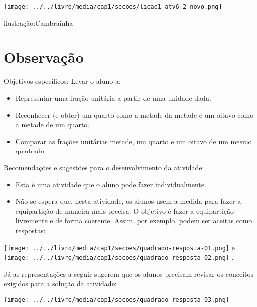 \documentclass{book}
\begin{document}
  $\ $     
  
    \texttt{[image: ../../livro/media/cap1/secoes/licao1\_atv6\_2\_novo.png]}  
  
  ilustração:Cambrainha  



\section{Observação}  
  
  Objetivos específicos: Levar o aluno a:  
\begin{itemize} %
    \item       Representar uma fração unitária a partir de uma unidade dada.  
    \item       Reconhecer (e obter) um quarto como a metade da metade e um oitavo como a metade de um quarto.
    \item       Comparar as frações unitárias metade, um quarto e um oitavo de um mesmo quadrado.
\end{itemize} %
  
  
  Recomendações e sugestões para o desenvolvimento da atividade:  
\begin{itemize} %
    \item       Esta é uma atividade que o aluno pode fazer individualmente. 
    \item       Não se espera que, nesta atividade, os alunos usem a medida para fazer a equipartição de maneira mais precisa. O objetivo é fazer a equipartição livremente e de forma coerente. Assim, por exemplo, podem ser aceitas como respostas:
\end{itemize} %
  
  
    \texttt{[image: ../../livro/media/cap1/secoes/quadrado-resposta-01.png]}   e     \texttt{[image: ../../livro/media/cap1/secoes/quadrado-resposta-02.png]}  .  
  
  Já as representações a seguir sugerem que os alunos precisam revisar os conceitos exigidos para a solução da atividade:  
  
    \texttt{[image: ../../livro/media/cap1/secoes/quadrado-resposta-03.png]}  
  
\end{document}
